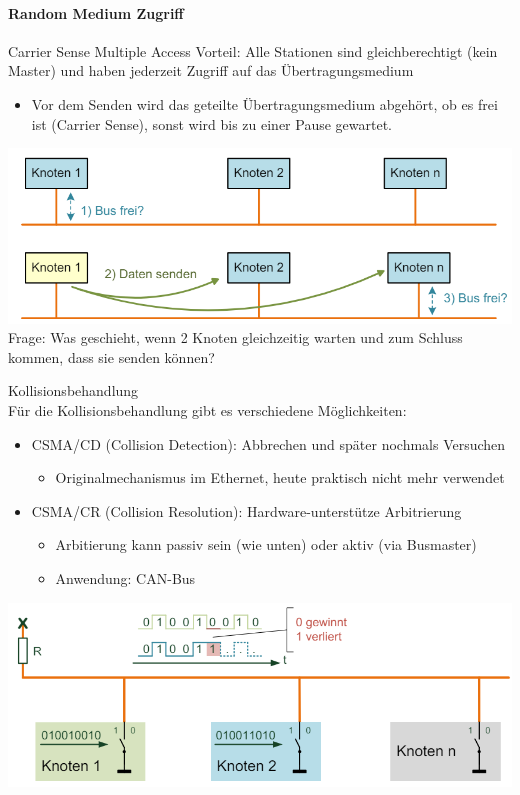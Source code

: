 \paragraph{Random Medium Zugriff}

\begin{definition}{Carrier Sense Multiple Access}
    Vorteil: Alle Stationen sind gleichberechtigt (kein Master) und haben jederzeit Zugriff auf das Übertragungsmedium
    \begin{itemize}
        \item Vor dem Senden wird das geteilte Übertragungsmedium abgehört, ob es frei ist (Carrier Sense), sonst wird bis zu einer Pause gewartet.
    \end{itemize}
        \includegraphics[width=0.75\linewidth]{images/random_access_thingy.png}\\
    Frage: Was geschieht, wenn 2 Knoten gleichzeitig warten und zum Schluss kommen, dass sie senden können?
\end{definition}

\begin{concept}{Kollisionsbehandlung}\\
    Für die Kollisionsbehandlung gibt es verschiedene Möglichkeiten:
    \begin{itemize}
        \item CSMA/CD (Collision Detection): Abbrechen und später nochmals Versuchen
        \begin{itemize}
            \item Originalmechanismus im Ethernet, heute praktisch nicht mehr verwendet
        \end{itemize}
        \item CSMA/CR (Collision Resolution): Hardware-unterstütze Arbitrierung
        \begin{itemize}
            \item Arbitierung kann passiv sein (wie unten) oder aktiv (via Busmaster)
            \item Anwendung: CAN-Bus
        \end{itemize}
    \end{itemize}
        \includegraphics[width=0.75\linewidth]{images/kollisionsbehandlung.png}
\end{concept}

